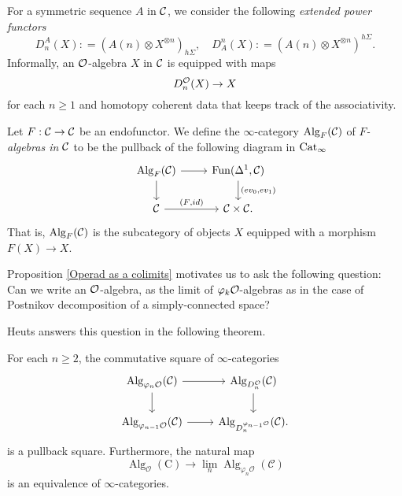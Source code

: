 For a symmetric sequence $A$ in ${\mathcal{C}}$, we consider the following \emph{extended power functors}
\begin{equation}
\label{extended power}
    D^{A}_n(X): = (A(n)\otimes X^{\otimes n })_{h\Sigma}, 
\quad
D_{A}^n(X): = (A(n)\otimes X^{\otimes n })^{h\Sigma}.
\end{equation}
Informally, an ${\mathcal{O}}$-algebra $X$ in ${\mathcal{C}}$ is equipped with maps
$$
D^{{\mathcal{O}}}_n(X) \to X
$$
for each $n\geq 1$ and homotopy coherent data that keeps track of the associativity.

\begin{definition}
Let $F:{\mathcal{C}}\to {\mathcal{C}}$ be an endofunctor.
	We define the $\infty$-category $\operatorname{Alg}_{F}({\mathcal{C}})$ of \emph{$F$-algebras in ${\mathcal{C}}$} to be the pullback of the following diagram in $\operatorname{Cat}_{\infty}$
\[
\begin{tikzcd}
	\Alg_{F}(\CC) & 
	\Fun(\Delta^1, \CC)\\
	\CC & 
	\CC \times \CC
	\arrow[from=1-1, to= 1-2]
	\arrow[from=1-1, to=2-1]
	\arrow[from=1-2, to=2-2, "(ev_0\text{,} ev_1)"]
	\arrow[from=2-1, to= 2-2, "(F\text{,} id)"].
\end{tikzcd}
\]
That is, $\operatorname{Alg}_{F}({\mathcal{C}})$ is the subcategory of objects $X$ equipped with a morphism $F(X)\to X$.
\end{definition}

Proposition \ref{Operad as a colimits} motivates us to ask the following question: Can we write an ${\mathcal{O}}$-algebra, as the limit of $\varphi_k{\mathcal{O}}$-algebras as in the case of Postnikov decomposition of a simply-connected space? 

Heuts answers this question in the following theorem.
\begin{theorem}
\cite[Theorem 4.1]{Heuts_Koszul}
\label{Thm 4.1 of Heuts Koszul Duality paper}
For each $n \geq 2$, the commutative square of $\infty$-categories
\[
\begin{tikzcd}
	\Alg_{\varphi_n\CO}(\CC) & 
	\Alg_{D^{\CO}_{n}}(\CC)\\
	\Alg_{\varphi_{n-1}\CO} (\CC)  & 
	\Alg_{D_{n}^{\varphi_{n-1}\CO}}(\CC)
	\arrow[from=1-1, to= 1-2]
	\arrow[from=1-1, to=2-1]
	\arrow[from=1-2, to=2-2]
	\arrow[from=2-1, to= 2-2].
\end{tikzcd}
\]
is a pullback square. Furthermore, the natural map
$$
\operatorname{Alg}_{\mathcal{O}}(\mathrm{C}) \rightarrow \lim _{n} \operatorname{Alg}_{\varphi_{n} \mathcal{O}}(\mathcal{C})
$$
is an equivalence of $\infty$-categories.
\end{theorem}


